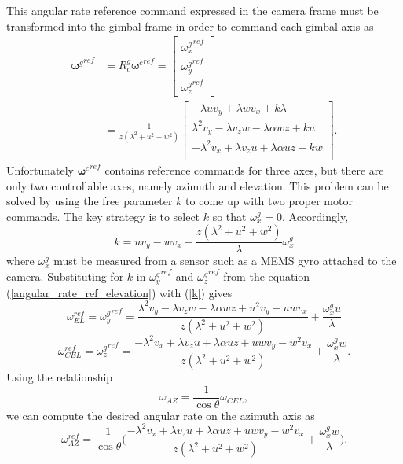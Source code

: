 This angular rate reference command expressed in the camera frame must be transformed into the gimbal frame in order to command each gimbal axis as
\begin{align}
{\mathbf{\omega}^g}^{ref}&=R_c^g{\mathbf{\omega}^c}^{ref}
=\begin{bmatrix}
{\omega_x^g}^{ref} \\ {\omega_y^g}^{ref} \\ {\omega_z^g}^{ref}
\end{bmatrix}
\\&=\frac{1}{z(\lambda^2+u^2+w^2)}\begin{bmatrix}
-\lambda u v_y+\lambda w v_x +k\lambda \\
\lambda^2 v_y-\lambda v_z w -\lambda \alpha wz+ku \\
-\lambda^2 v_x+\lambda v_zu +\lambda \alpha uz+kw \\
\end{bmatrix}.
\label{angular_rate_ref_elevation}
\end{align}
Unfortunately ${\mathbf{\omega}^c}^{ref}$ contains reference commands for three axes, but there are only two controllable axes, namely azimuth and elevation. This problem can be solved by using the free parameter $k$ to come up with two proper motor commands. The key strategy is to select $k$ so that $\omega_x^g=0$. Accordingly,  
\begin{equation}
k=uv_y-wv_x+\frac{z(\lambda^2+u^2+w^2)}{\lambda}\omega_x^g
\label{k}
\end{equation}
where $\omega_x^g$ must be measured from a sensor such as a MEMS gyro attached to the camera. Substituting for $k$ in ${\omega_y^g}^{ref}$ and ${\omega_z^g}^{ref}$ from the equation (\ref{angular_rate_ref_elevation}) with (\ref{k}) gives
\begin{equation}
\omega_{EL}^{ref}={\omega_y^g}^{ref}=\frac{\lambda^2 v_y-\lambda v_z w -\lambda \alpha wz+u^2 v_y-uwv_x}{z(\lambda^2+u^2+w^2)}+\frac{\omega_x^g u}{\lambda}
\end{equation}
\begin{equation}
\omega_{CEL}^{ref}={\omega_z^g}^{ref}=\frac{-\lambda^2 v_x+\lambda v_z u+\lambda \alpha uz +uwv_y -w^2 v_x}{z(\lambda^2+u^2+w^2)}+\frac{\omega_x^g w}{\lambda}.
\end{equation}
Using the relationship 
\begin{equation}
\omega_{AZ}=\frac{1}{\cos\theta}\omega_{CEL},
\end{equation}
we can compute the desired angular rate on the azimuth axis as
\begin{equation}
\omega_{AZ}^{ref}=\frac{1}{\cos \theta}\bigg(\frac{-\lambda^2 v_x+\lambda v_z u+\lambda \alpha uz +uwv_y -w^2 v_x}{z(\lambda^2+u^2+w^2)}+\frac{\omega_x^g w}{\lambda}\bigg).
\end{equation}
